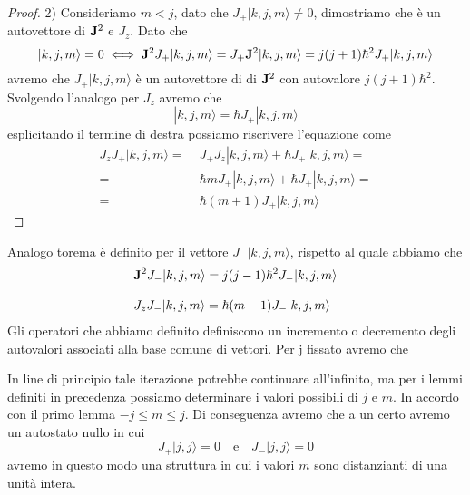 \begin{proof}
	2) Consideriamo $m <j$, dato che $J_+|k,j,m \rangle  \neq 0$, dimostriamo che \`e un autovettore di $\bold{J}^2$ e $J_z $. Dato che 
	\begin{equation*}
		[\bold{J}^2,J_+] |k,j,m \rangle = 0 \iff \bold{J}^2J_+|k,j,m \rangle = J_+\bold{J}^2|k,j,m \rangle = j(j+1)\hbar^2 J_+|k,j,m \rangle
	\end{equation*}	
avremo che $J_+|k,j,m \rangle$ \`e un autovettore di di $\bold{J}^2$ con autovalore $j(j+1)\hbar^2$. Svolgendo l'analogo per $J_z$ avremo che 
\begin{equation*}
	[J_z,J_+]|k,j,m \rangle = \hbar J_+ |k,j,m \rangle 
\end{equation*}
esplicitando il termine di destra possiamo riscrivere l'equazione come 
\newpage
\begin{align*}
	J_zJ_+|k,j,m \rangle = & \; J_+J_z|k,j,m \rangle + \hbar J_+|k,j,m \rangle = \\[0.3cm]
	= &  \; \hbar m J_+|k,j,m \rangle  + \hbar J_+|k,j,m \rangle = \\[0.3cm]
	= &  \; \hbar(m+1)J_+|k,j,m \rangle 
\end{align*}

\end{proof}
 Analogo torema \`e definito per il vettore $J_-|k,j,m \rangle$, rispetto al quale abbiamo che 
 \begin{align*}
 	& \bold{J}^2J_-|k,j,m \rangle = j(j-1)\hbar^2J_-|k,j,m \rangle \\[0.3cm]
 	& J_zJ_-|k,j,m \rangle = \hbar(m-1) J_-|k,j,m\rangle 
 \end{align*}
 Gli operatori che abbiamo definito definiscono un incremento o decremento degli autovalori associati alla base comune di vettori. Per j fissato avremo che 
 
\vspace{1cm}
\vspace{1cm}

In line di principio tale iterazione potrebbe continuare all'infinito, ma per i lemmi definiti in precedenza possiamo determinare i valori possibili di $j$ e $m$. In accordo con il primo lemma $-j \leq m \leq j$. Di conseguenza avremo che a un certo avremo un autostato nullo in cui 
\begin{equation*}
	J_+|j,j \rangle = 0 \quad \text{e} \quad J_-|j,j \rangle = 0
\end{equation*} 
avremo in questo modo una struttura in cui i valori $m$ sono distanzianti di una unit\`a intera.
\newline

